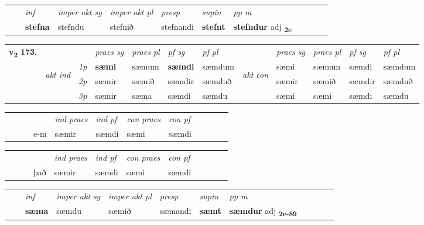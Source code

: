 \begin{tabular}{llllllllllll}
 & & \textit{inf} & \textit{imper akt sg} & \textit{imper akt pl}   & \textit{presp} & \textit{supin}  & \textit{pp m}     \\*
  & & \textbf{stefna} & stefndu  & stefnið   & stefnandi &  \textbf{stefnt}  & \textbf{stefndur} adj \textbf{\textsubscript{2e}} \\*
\cmidrule{1-12}
\end{tabular}



\begin{tabular}{llllllllllll} \toprule
\multirow{4}{*}{{{\textbf{v{\textsubscript{2}}} \Large{\textbf{173.}}}}}  & &   &  \textit{praes sg}  & \textit{praes pl}  &\textit{ pf sg} & \textit{pf pl} &  &  \textit{praes sg}  & \textit{praes pl}  & \textit{pf sg} & \textit{pf pl } \\*
	\cmidrule{4-7} \cmidrule{9-12}
 & \multirow{3}{*}{\begin{turn}{90}\textit{akt ind}\end{turn}} & {\textit{1p}} & \textbf{sæmi} & sæmum    & \textbf{sæmdi} & sæmdum & \multirow{3}{*}{\begin{turn}{90}\textit{akt con}\end{turn}} &sæmi & sæmum & sæmdi & sæmdum\\*
& &  {\textit{2p}} &  sæmir  & sæmið   & sæmdir & sæmduð & & sæmir & sæmið & sæmdir & sæmduð \\*
& &  {\textit{3p}} & sæmir & sæma   & sæmdi & sæmdu & & sæmi & sæmi& sæmdi & sæmdu  \\*
\cmidrule{4-7} \cmidrule{9-12}
\end{tabular}


\begin{tabular}{llllllllllll}
 & &  & &  \textit{ind praes} & \textit{ind pf} & \textit{con praes} & \textit{con pf} \\*
&  & & e-m & sæmir & sæmdi & sæmi & sæmdi \\*
\cmidrule{5-9}
\end{tabular}


\begin{tabular}{llllllllllll}
 & &  & &  \textit{ind praes} & \textit{ind pf} & \textit{con praes} & \textit{con pf} \\*
&  & & það & sæmir & sæmdi & sæmi & sæmdi \\*
\cmidrule{5-9}
\end{tabular}


\begin{tabular}{llllllllllll}
 & & \textit{inf} & \textit{imper akt sg} & \textit{imper akt pl}   & \textit{presp} & \textit{supin}  & \textit{pp m}     \\*
  & & \textbf{sæma} & sæmdu  & sæmið   & sæmandi &  \textbf{sæmt}  & \textbf{sæmdur} adj \textbf{\textsubscript{2e-89}} \\*
\cmidrule{1-12}
\end{tabular}





